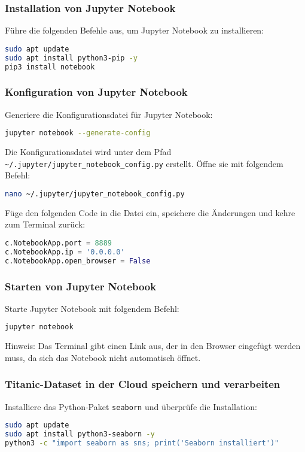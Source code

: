 \documentclass[a4paper,12pt]{article}
\begin{document}
\subsubsection{Installation von Jupyter Notebook}
Führe die folgenden Befehle aus, um Jupyter Notebook zu installieren:
\begin{lstlisting}[language=bash]
sudo apt update
sudo apt install python3-pip -y
pip3 install notebook
\end{lstlisting}

\subsubsection{Konfiguration von Jupyter Notebook}
Generiere die Konfigurationsdatei für Jupyter Notebook:
\begin{lstlisting}[language=bash]
jupyter notebook --generate-config
\end{lstlisting}

\noindent
Die Konfigurationsdatei wird unter dem Pfad \texttt{\textasciitilde/.jupyter/jupyter\_notebook\_config.py} erstellt. Öffne sie mit folgendem Befehl:
\begin{lstlisting}[language=bash]
nano ~/.jupyter/jupyter_notebook_config.py
\end{lstlisting}

\noindent
Füge den folgenden Code in die Datei ein, speichere die Änderungen und kehre zum Terminal zurück:
\begin{lstlisting}[language=Python]
c.NotebookApp.port = 8889
c.NotebookApp.ip = '0.0.0.0'
c.NotebookApp.open_browser = False
\end{lstlisting}

\subsubsection{Starten von Jupyter Notebook}
Starte Jupyter Notebook mit folgendem Befehl:
\begin{lstlisting}[language=bash]
jupyter notebook
\end{lstlisting}

\noindent
Hinweis: Das Terminal gibt einen Link aus, der in den Browser eingefügt werden muss, da sich das Notebook nicht automatisch öffnet.

\subsubsection{Titanic-Dataset in der Cloud speichern und verarbeiten}
Installiere das Python-Paket \texttt{seaborn} und überprüfe die Installation:
\begin{lstlisting}[language=bash]
sudo apt update
sudo apt install python3-seaborn -y
python3 -c "import seaborn as sns; print('Seaborn installiert')"
\end{lstlisting}
\end{document}
